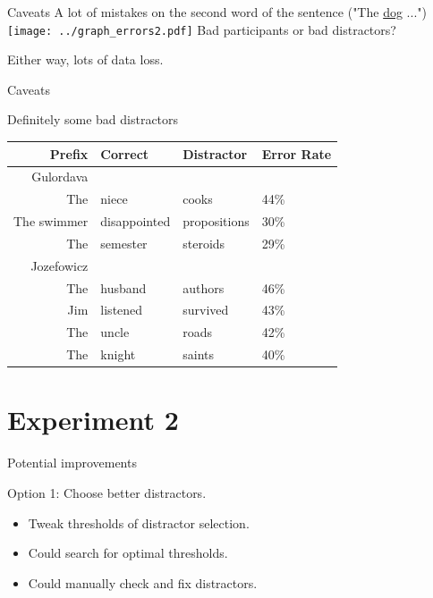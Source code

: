 \documentclass[12pt, xcolor=beamer,table,usenames,dvipsnames, ignorenonframetext, ngerman]{beamer}
\begin{document}
\begin{frame}{Caveats}
A lot of mistakes on the second word of the sentence ("The \ul{dog} ...") \pause
\texttt{[image: ../graph\_errors2.pdf]} \pause
Bad participants or bad distractors? 

Either way, lots of data loss.
\end{frame}

\begin{frame}{Caveats}

{\large Definitely some bad distractors}
\begin{table}
	
		
		\begin{tabular}{rlll}
			Prefix & Correct & Distractor & Error Rate \\
			\hline
			\hline
			Gulordava&&&\\
			\hline
			The & niece & cooks & 44\%\\
			The swimmer & disappointed & propositions & 30\%\\
			The & semester & steroids & 29\%\\
			\hline
			\hline
			 Jozefowicz&&&\\
			\hline
			The & husband & authors & 46\%\\
			Jim & listened & survived & 43\%\\
			The & uncle & roads & 42\%\\
			The & knight & saints & 40\%\\
		\end{tabular}
\end{table}

\end{frame}

\section{Experiment 2}

\begin{frame}{Potential improvements}

{\large Option 1: Choose better distractors.} \pause
\begin{itemize}
	\item Tweak thresholds of distractor selection. \pause
	\item Could search for optimal thresholds. \pause
	\item Could manually check and fix distractors. 
\end{itemize}

\end{frame}
\end{document}
